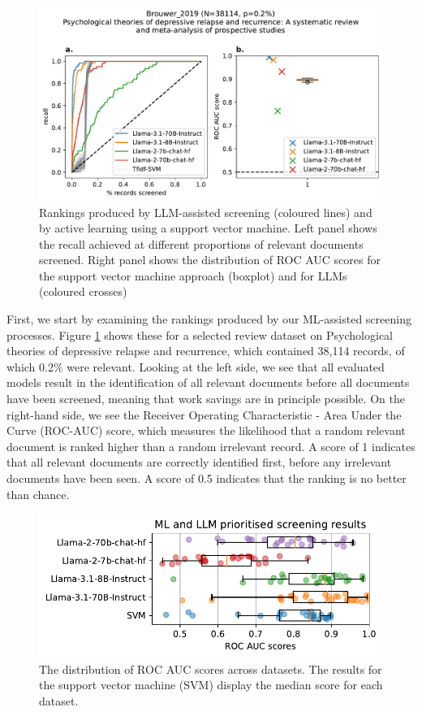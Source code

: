 \documentclass{article}
\begin{document}
	\begin{figure}
		\includegraphics[width=\linewidth]{../../figures/Brouwer_2019.pdf}
		\caption{Rankings produced by LLM-assisted screening (coloured lines) and by active learning using a support vector machine. Left panel shows the recall achieved at different proportions of relevant documents screened. Right panel shows the distribution of ROC AUC scores for the support vector machine approach (boxplot) and for LLMs (coloured crosses)}
		\label{fig:rankings}
	\end{figure}
	
	First, we start by examining the rankings produced by our ML-assisted screening processes. Figure \ref{fig:rankings} shows these for a selected review dataset on Psychological theories of depressive relapse and recurrence, which contained 38,114 records, of which 0.2\% were relevant. Looking at the left side, we see that all evaluated models result in the identification of all relevant documents before all documents have been screened, meaning that work savings are in principle possible. On the right-hand side, we see the Receiver Operating Characteristic - Area Under the Curve (ROC-AUC) score, which measures the likelihood that a random relevant document is ranked higher than a random irrelevant record. A score of 1 indicates that all relevant documents are correctly identified first, before any irrelevant documents have been seen. A score of 0.5 indicates that the ranking is no better than chance.
	

\begin{figure}
	\includegraphics[width=\columnwidth]{../../figures/macro_comparison.pdf}
	\caption{The distribution of ROC AUC scores across datasets. The results for the support vector machine (SVM) display the median score for each dataset.}
	\label{fig:macro}
\end{figure}
\end{document}
